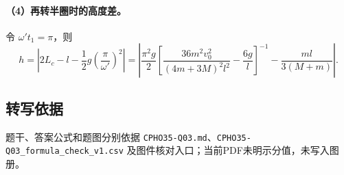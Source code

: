 \paragraph{（4）再转半圈时的高度差。} 令 $\omega't_1=\pi$，则
\[
h=\left|2L_c-l-\frac12g\left(\frac\pi{\omega'}\right)^2\right|
=\left|\frac{\pi^2g}{2}\left[\frac{36m^2v_0^2}{(4m+3M)^2l^2}-\frac{6g}{l}\right]^{-1}-\frac{ml}{3(M+m)}\right|.
\]

\subsection{转写依据}
题干、答案公式和题图分别依据 \texttt{CPHO35-Q03.md}、\texttt{CPHO35-Q03\_formula\_check\_v1.csv} 及图件核对入口；当前PDF未明示分值，未写入图册。
